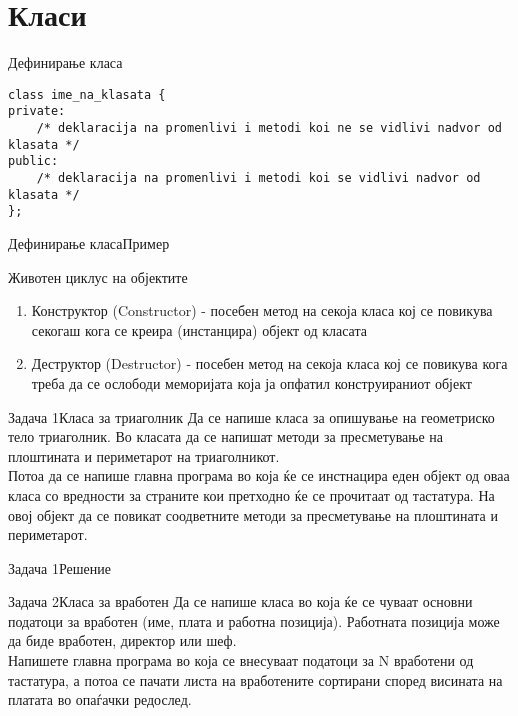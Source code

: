 \section{Класи}

\begin{frame}[fragile,shrink=-50]{Дефинирање класа}
\begin{lstlisting}
class ime_na_klasata {
private:
    /* deklaracija na promenlivi i metodi koi ne se vidlivi nadvor od klasata */
public:
    /* deklaracija na promenlivi i metodi koi se vidlivi nadvor od klasata */
};
\end{lstlisting}
\end{frame}

\begin{frame}[fragile,shrink=10]{Дефинирање класа}{Пример}

\end{frame}

\begin{frame}{Животен циклус на објектите}
\begin{enumerate}
  \item Конструктор (Constructor) - посебен метод на секоја класа кој се
  повикува секогаш кога се креира (инстанцира) објект од класата
  \item Деструктор (Destructor) - посебен метод на секоја класа кој се
  повикува кога треба да се ослободи меморијата која ја опфатил конструираниот
  објект
\end{enumerate}
\end{frame}

\begin{frame}{Задача 1}{Класа за триаголник}
Да се напише класа за опишување на геометриско тело триаголник. Во класата да се
напишат методи за пресметување на плоштината и периметарот на триаголникот.\\
Потоа да се напише главна програма во која ќе се инстнацира еден објект од оваа
класа со вредности за страните кои претходно ќе се прочитаат од тастатура. На
овој објект да се повикат соодветните методи за пресметување на плоштината и
периметарот.
\end{frame}

\begin{frame}[fragile]{Задача 1}{Решение}

\end{frame}

\begin{frame}{Задача 2}{Класа за вработен}
Да се напише класа во која ќе се чуваат основни податоци за вработен (име,
плата и работна позиција). Работната позиција може да биде вработен, директор
или шеф.\\
Напишете главна програма во која се внесуваат податоци за N вработени од
тастатура, а потоа се пачати листа на вработените сортирани според висината на
платата во опаѓачки редослед.
\end{frame}

